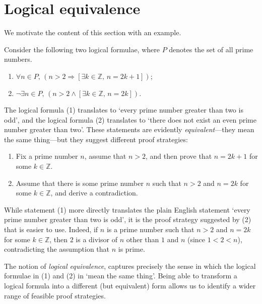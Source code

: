 \section{Logical equivalence}

We motivate the content of this section with an example.

\begin{example}
\label{exNoEvenPrimeGreaterThanTwo}
Consider the following two logical formulae, where $P$ denotes the set of all prime numbers.
\begin{enumerate}[(1)]
\item $\forall n \in P,\, (n > 2 \Rightarrow [\exists k \in \mathbb{Z},\, n=2k+1])$;
\item $\neg \exists n \in P,\, (n > 2 \wedge [\exists k \in \mathbb{Z},\, n=2k])$.
\end{enumerate}
The logical formula (1) translates to `every prime number greater than two is odd', and the logical formula (2) translates to `there does not exist an even prime number greater than two'. These statements are evidently \textit{equivalent}---they mean the same thing---but they suggest different proof strategies:

\begin{enumerate}[(1)]
\item Fix a prime number $n$, assume that $n>2$, and then prove that $n = 2k+1$ for some $k \in \mathbb{Z}$.
\item Assume that there is some prime number $n$ such that $n>2$ and $n=2k$ for some $k \in \mathbb{Z}$, and derive a contradiction.
\end{enumerate}

While statement (1) more directly translates the plain English statement `every prime number greater than two is odd', it is the proof strategy suggested by (2) that is easier to use. Indeed, if $n$ is a prime number such that $n>2$ and $n=2k$ for some $k \in \mathbb{Z}$, then $2$ is a divisor of $n$ other than $1$ and $n$ (since $1<2<n$), contradicting the assumption that $n$ is prime.
\end{example}

The notion of \textit{logical equivalence}, captures precisely the sense in which the logical formulae in (1) and (2) in  `mean the same thing'. Being able to transform a logical formula into a different (but equivalent) form allows us to identify a wider range of feasible proof strategies.

